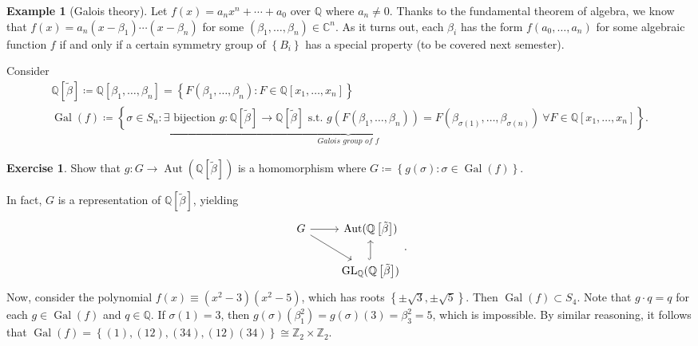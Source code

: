 \documentclass[10pt,letterpaper,cm]{nupset}
\theoremstyle{definition}
\newtheorem{exmp}[definition]{Example}
\theoremstyle{theorem}
\newtheorem{exercise}[definition]{Exercise}
\theoremstyle{remark}
\newcommand{\C}{\mathbb C}
\newcommand{\Q}{\mathbb Q}
\newcommand{\Z}{\mathbb Z}
\newcommand{\1}{\mathbf{1}}
\newcommand{\0}{\vec 0}
\DeclareMathOperator*{\GL}{GL}
\DeclareMathOperator{\gal}{Gal}
\DeclareMathOperator{\aut}{Aut}
\begin{document}
\medskip

\begin{exmp}[Galois theory]
Let $f(x) = a_nx^n + \cdots + a_0$ over $\Q$ where $a_n \ne 0$. Thanks to the fundamental theorem of algebra, we know that $f(x) = a_n\left(x-\beta_1\right)\cdots \left(x-\beta_n\right)$ for some $\left(\beta_1, \ldots, \beta_n\right) \in \C^n$. As it turns out, each $\beta_i$ has the form $f(a_0, \ldots, a_n)$ for some algebraic function $f$  if and only if a certain symmetry group of $\left\{B_i\right\}$ has a special property (to be covered next semester).

\smallskip

Consider 
\begin{gather*}
\Q\left[\tilde{\beta}\right]  \coloneqq  \Q\left[\beta_1, \ldots, \beta_n\right] = \left\{F(\beta_1, \ldots, \beta_n) : F \in \Q\left[x_1, \ldots, x_n\right]\right\} \\ \underbrace{\gal(f)  \coloneqq  \left\{\sigma \in S_n : \exists\text{ bijection } g : \Q\left[\tilde{\beta}\right] \to \Q\left[\tilde{\beta}\right] \text{ s.t. }  g(F(\beta_1, \ldots, \beta_n)) = F(\beta_{\sigma(1)}, \ldots, \beta_{\sigma(n)})\  \forall{F} \in \Q\left[x_1, \ldots, x_n\right]\right\}}_{\textit{Galois group of }f}.
\end{gather*}

\begin{exercise}
Show that $g: G \to \aut(\Q\left[\tilde{\beta}\right])$ is a homomorphism where $G \coloneqq  \left\{g(\sigma): \sigma \in \gal(f)\right\}$.
\end{exercise}

\smallskip

In fact, $G$ is a representation of $\Q\left[\tilde{\beta}\right]$, yielding
\[ \begin{tikzcd}
G \arrow{r} \arrow[swap]{dr} & \aut(\Q\left[\tilde{\beta}\right]) \\%
 & \GL_\Q(\Q\left[\tilde{\beta}\right]) \arrow[hookrightarrow]{u}
\end{tikzcd}.
\]
Now, consider the polynomial $f(x) \equiv (x^2 -3)(x^2 -5)$, which has roots $\left\{\pm \sqrt{3}, \pm \sqrt{5}\right\}$. Then $\gal(f) \subset S_4$. Note that $g\cdot q= q$ for each $g \in \gal(f)$ and $q\in \Q$. If $\sigma(1) =3$, then $g(\sigma)(\beta_1^2) = g(\sigma)  (3) = \beta_3^2 = 5$, which is impossible. By similar reasoning, it follows that $\gal(f) = \left\{(1), (1 2), (3 4), (1 2)(3 4)\right\} \cong \Z_2 \times \Z_2$.
\end{exmp}
\end{document}

